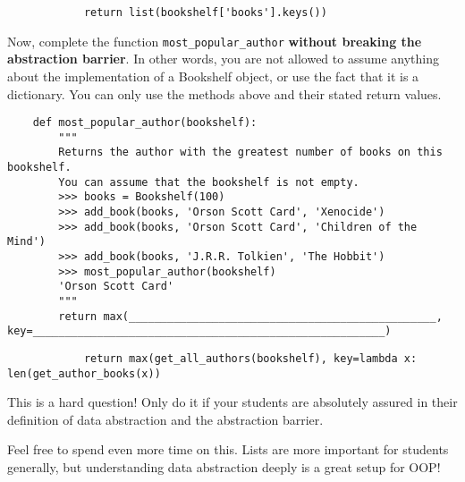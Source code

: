     \begin{solution}[1in]
        \begin{lstlisting}
            return list(bookshelf['books'].keys())
        \end{lstlisting}
    \end{solution}

    \newpage
    Now, complete the function \lstinline{most_popular_author} \textbf{without breaking the abstraction barrier}.
    In other words, you are not allowed to assume anything about the implementation of a Bookshelf object, or
    use the fact that it is a dictionary. You can only use the methods above and their stated return values.

    \begin{lstlisting}
    def most_popular_author(bookshelf):
        """
        Returns the author with the greatest number of books on this bookshelf.
        You can assume that the bookshelf is not empty.
        >>> books = Bookshelf(100)
        >>> add_book(books, 'Orson Scott Card', 'Xenocide')
        >>> add_book(books, 'Orson Scott Card', 'Children of the Mind')
        >>> add_book(books, 'J.R.R. Tolkien', 'The Hobbit')
        >>> most_popular_author(bookshelf)
        'Orson Scott Card'
        """
        return max(________________________________________________, key=_______________________________________________________)
    \end{lstlisting}


    \begin{solution}[1in]
        \begin{lstlisting}
            return max(get_all_authors(bookshelf), key=lambda x: len(get_author_books(x))
        \end{lstlisting}
    \end{solution}

    \begin{questionmeta}
        This is a hard question! Only do it if your students are absolutely assured in their definition of data abstraction and the abstraction barrier.

        Feel free to spend even more time on this. Lists are more important for students generally, but understanding data abstraction deeply is a great setup for OOP!
    \end{questionmeta}
